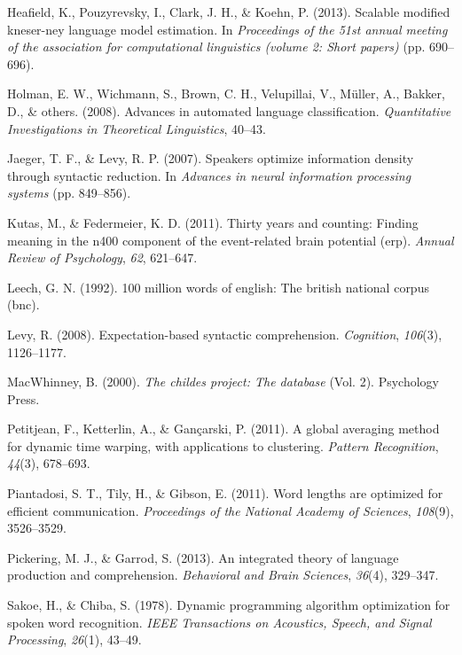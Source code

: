 \documentclass[10pt, letterpaper]{article}
\begin{document}
\leavevmode\hypertarget{ref-heafield2013scalable}{}%
Heafield, K., Pouzyrevsky, I., Clark, J. H., \& Koehn, P. (2013).
Scalable modified kneser-ney language model estimation. In
\emph{Proceedings of the 51st annual meeting of the association for
computational linguistics (volume 2: Short papers)} (pp. 690--696).

\leavevmode\hypertarget{ref-holman2008}{}%
Holman, E. W., Wichmann, S., Brown, C. H., Velupillai, V., Müller, A.,
Bakker, D., \& others. (2008). Advances in automated language
classification. \emph{Quantitative Investigations in Theoretical
Linguistics}, 40--43.

\leavevmode\hypertarget{ref-jaeger2007}{}%
Jaeger, T. F., \& Levy, R. P. (2007). Speakers optimize information
density through syntactic reduction. In \emph{Advances in neural
information processing systems} (pp. 849--856).

\leavevmode\hypertarget{ref-kutas2011}{}%
Kutas, M., \& Federmeier, K. D. (2011). Thirty years and counting:
Finding meaning in the n400 component of the event-related brain
potential (erp). \emph{Annual Review of Psychology}, \emph{62},
621--647.

\leavevmode\hypertarget{ref-leech1992}{}%
Leech, G. N. (1992). 100 million words of english: The british national
corpus (bnc).

\leavevmode\hypertarget{ref-levy2008}{}%
Levy, R. (2008). Expectation-based syntactic comprehension.
\emph{Cognition}, \emph{106}(3), 1126--1177.

\leavevmode\hypertarget{ref-macwhinney2000}{}%
MacWhinney, B. (2000). \emph{The childes project: The database} (Vol.
2). Psychology Press.

\leavevmode\hypertarget{ref-petitjean2011}{}%
Petitjean, F., Ketterlin, A., \& Gançarski, P. (2011). A global
averaging method for dynamic time warping, with applications to
clustering. \emph{Pattern Recognition}, \emph{44}(3), 678--693.

\leavevmode\hypertarget{ref-piantadosi2011}{}%
Piantadosi, S. T., Tily, H., \& Gibson, E. (2011). Word lengths are
optimized for efficient communication. \emph{Proceedings of the National
Academy of Sciences}, \emph{108}(9), 3526--3529.

\leavevmode\hypertarget{ref-pickering2013}{}%
Pickering, M. J., \& Garrod, S. (2013). An integrated theory of language
production and comprehension. \emph{Behavioral and Brain Sciences},
\emph{36}(4), 329--347.

\leavevmode\hypertarget{ref-sakoe1978}{}%
Sakoe, H., \& Chiba, S. (1978). Dynamic programming algorithm
optimization for spoken word recognition. \emph{IEEE Transactions on
Acoustics, Speech, and Signal Processing}, \emph{26}(1), 43--49.
\end{document}
